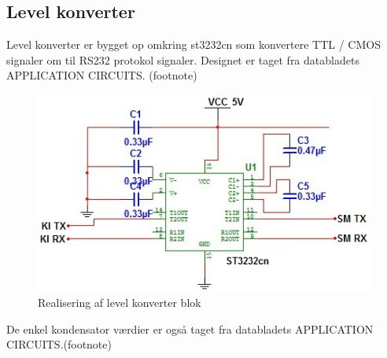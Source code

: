 \subsection{Level konverter}
Level konverter er bygget op omkring st3232cn som konvertere TTL / CMOS signaler om til RS232 protokol signaler.
Designet er taget fra databladets APPLICATION CIRCUITS. (footnote) 
\begin{figure}[H]
\centering
\includegraphics[scale=1]{billeder/Level_konvertor_dia}
\caption{Realisering af level konverter blok}
\label{fig:Lvl_konverter}
\end{figure}
De enkel kondensator værdier er også taget fra databladets APPLICATION CIRCUITS.(footnote) 
